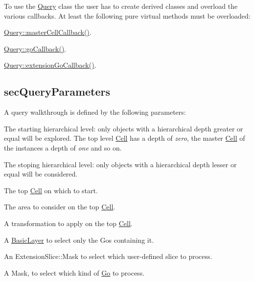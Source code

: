 To use the \hyperlink{classHurricane_1_1Query}{Query} class the user has to create derived classes and overload the various callbacks. At least the following pure virtual methods must be overloaded\-:
\begin{DoxyItemize}
\item \hyperlink{classHurricane_1_1Query_abaf97e93c7fa96469adf64f7865938b4}{Query\-::master\-Cell\-Callback()}.
\item \hyperlink{classHurricane_1_1Query_a59007148bd0afa0405801f341e7e4139}{Query\-::go\-Callback()}.
\item \hyperlink{classHurricane_1_1Query_a75b87e969b64caaf24ec058c0d2dfa68}{Query\-::extension\-Go\-Callback()}.
\end{DoxyItemize}\hypertarget{classHurricane_1_1Query_secQueryParameters}{}\subsection{sec\-Query\-Parameters}\label{classHurricane_1_1Query_secQueryParameters}
A query walkthrough is defined by the following parameters\-:
\begin{DoxyItemize}
\item The starting hierarchical level\-: only objects with a hierarchical depth greater or equal will be explored. The top level \hyperlink{classHurricane_1_1Cell}{Cell} has a depth of {\itshape zero}, the master \hyperlink{classHurricane_1_1Cell}{Cell} of the instances a depth of {\itshape one} and so on.
\item The stoping hierarchical level\-: only objects with a hierarchical depth lesser or equal will be considered.
\item The top \hyperlink{classHurricane_1_1Cell}{Cell} on which to start.
\item The area to consider on the top \hyperlink{classHurricane_1_1Cell}{Cell}.
\item A transformation to apply on the top \hyperlink{classHurricane_1_1Cell}{Cell}.
\item A \hyperlink{classHurricane_1_1BasicLayer}{Basic\-Layer} to select only the Gos containing it.
\item An Extension\-Slice\-::\-Mask to select which user-\/defined slice to process.
\item A Mask, to select which kind of \hyperlink{classHurricane_1_1Go}{Go} to process. 
\end{DoxyItemize}

